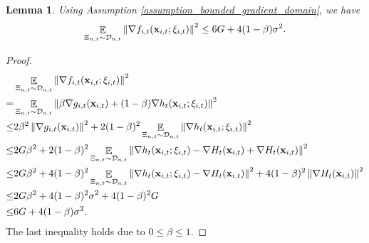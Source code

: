 \documentclass{article}
\newtheorem{Lemma}{\bf{Lemma}}
\begin{document}
\begin{Lemma}
\label{lemma_stochastic_gradient_norm_bound}
Using Assumption \ref{assumption_bounded_gradient_domain}, we have
\begin{align}
\nonumber
\mathop{\mathbb{E}}_{ \Xi_{n,t} \sim \mathcal{D}_{n,t} }\left\lVert \nabla f_{i,t}({\bf x}_{i,t};\xi_{i,t})\right\rVert^2 \le 6G  + 4 (1-\beta)\sigma^2.
\end{align}


\end{Lemma}
\begin{proof}

\begin{align}
\nonumber
& \mathop{\mathbb{E}}_{ \Xi_{n,t} \sim \mathcal{D}_{n,t} }\left\lVert \nabla f_{i,t}({\bf x}_{i,t};\xi_{i,t})\right\rVert^2 \\ \nonumber 
= & \mathop{\mathbb{E}}_{ \Xi_{n,t} \sim \mathcal{D}_{n,t} }\left\lVert \beta \nabla g_{i,t}({\bf x}_{i,t}) + (1-\beta)\nabla h_t({\bf x}_{i,t};\xi_{i,t})\right\rVert^2 \\ \nonumber 
\le &  2\beta^2 \left\lVert \nabla g_{i,t}({\bf x}_{i,t}) \right\rVert^2 + 2(1-\beta)^2 \mathop{\mathbb{E}}_{ \Xi_{n,t} \sim \mathcal{D}_{n,t} } \left\lVert \nabla h_t({\bf x}_{i,t};\xi_{i,t}) \right\rVert^2 \\ \nonumber 
\le & 2G\beta^2  + 2(1-\beta)^2 \mathop{\mathbb{E}}_{ \Xi_{n,t} \sim \mathcal{D}_{n,t} } \left\lVert \nabla h_t({\bf x}_{i,t};\xi_{i,t}) - \nabla H_t({\bf x}_{i,t}) + \nabla H_t({\bf x}_{i,t})\right\rVert^2 \\ \nonumber 
\le & 2G\beta^2  +  4(1-\beta)^2 \mathop{\mathbb{E}}_{ \Xi_{n,t} \sim \mathcal{D}_{n,t} } \left\lVert \nabla h_t({\bf x}_{i,t};\xi_{i,t}) - \nabla H_t({\bf x}_{i,t}) \right\rVert^2 +  4(1-\beta)^2 \left\lVert \nabla H_t({\bf x}_{i,t})\right\rVert^2 \\ \nonumber 
\le & 2G\beta^2  + 4(1-\beta)^2 \sigma^2 + 4(1-\beta)^2 G \\ \nonumber 
\le & 6G  + 4 (1-\beta)\sigma^2.
\end{align} The last inequality holds due to $0\le \beta \le 1$.
\end{proof}
\end{document}
